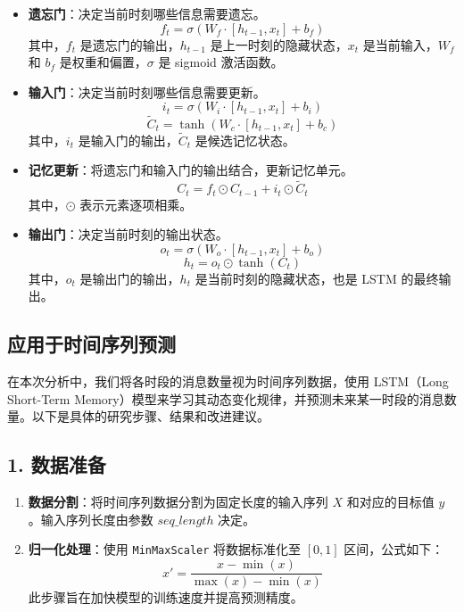 \documentclass{paper}
\begin{document}
\begin{itemize}
    \item \textbf{遗忘门}：决定当前时刻哪些信息需要遗忘。
    \[
    f_t = \sigma(W_f \cdot [h_{t-1}, x_t] + b_f)
    \]
    其中，$f_t$ 是遗忘门的输出，$h_{t-1}$ 是上一时刻的隐藏状态，$x_t$ 是当前输入，$W_f$ 和 $b_f$ 是权重和偏置，$\sigma$ 是 sigmoid 激活函数。

    \item \textbf{输入门}：决定当前时刻哪些信息需要更新。
    \[
    i_t = \sigma(W_i \cdot [h_{t-1}, x_t] + b_i)
    \]
    \[
    \tilde{C}_t = \tanh(W_c \cdot [h_{t-1}, x_t] + b_c)
    \]
    其中，$i_t$ 是输入门的输出，$\tilde{C}_t$ 是候选记忆状态。

    \item \textbf{记忆更新}：将遗忘门和输入门的输出结合，更新记忆单元。
    \[
    C_t = f_t \odot C_{t-1} + i_t \odot \tilde{C}_t
    \]
    其中，$\odot$ 表示元素逐项相乘。

    \item \textbf{输出门}：决定当前时刻的输出状态。
    \[
    o_t = \sigma(W_o \cdot [h_{t-1}, x_t] + b_o)
    \]
    \[
    h_t = o_t \odot \tanh(C_t)
    \]
    其中，$o_t$ 是输出门的输出，$h_t$ 是当前时刻的隐藏状态，也是 LSTM 的最终输出。
\end{itemize}

\subsection{应用于时间序列预测}

在本次分析中，我们将各时段的消息数量视为时间序列数据，使用 LSTM（Long Short-Term Memory）模型来学习其动态变化规律，并预测未来某一时段的消息数量。以下是具体的研究步骤、结果和改进建议。

\subsection*{1. 数据准备}
\begin{enumerate}[label=(\alph*)]
    \item \textbf{数据分割}：将时间序列数据分割为固定长度的输入序列 $X$ 和对应的目标值 $y$。输入序列长度由参数 $seq\_length$ 决定。
    \item \textbf{归一化处理}：使用 \texttt{MinMaxScaler} 将数据标准化至 $[0, 1]$ 区间，公式如下：
    \[
    x' = \frac{x - \min(x)}{\max(x) - \min(x)}
    \]
    此步骤旨在加快模型的训练速度并提高预测精度。
\end{enumerate}
\end{document}
